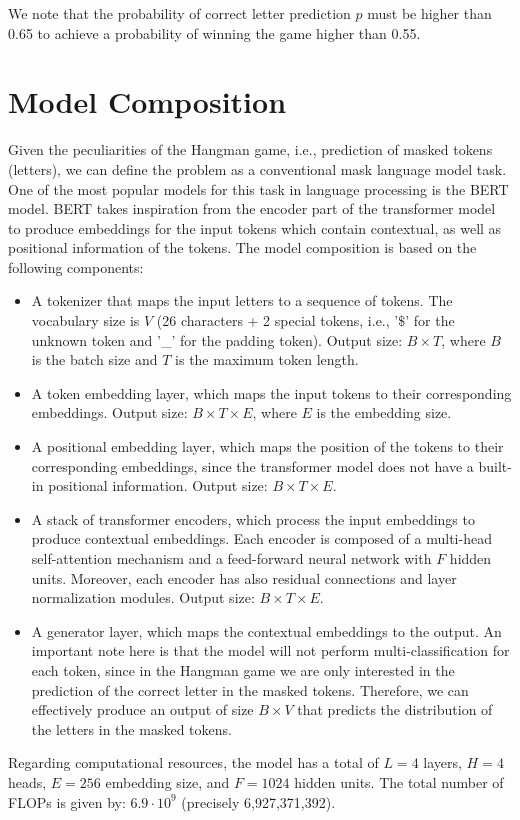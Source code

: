 \documentclass{report}
\begin{document}
We note that the probability of correct letter prediction $p$ must be 
higher than 0.65 to achieve a probability of winning the game higher than 0.55. 


\section*{Model Composition}
Given the peculiarities of the Hangman game, i.e., prediction of masked tokens (letters), we can define the 
problem as a conventional mask language model task. 
One of the most popular models for this task in language processing is the 
\ac{BERT} model. \ac{BERT} takes inspiration from the encoder part of the transformer model to 
produce embeddings for the input tokens which contain contextual, as well as positional information of the tokens.
The model composition is based on the following components:
\begin{itemize}
    \item A tokenizer that maps the input letters to a sequence of tokens. The vocabulary size is $V$ (26 characters + 2 special tokens, i.e., '$\$$' for the unknown token and '\_' for the padding token).
    Output size: $B \times T$, where $B$ is the batch size and $T$ is the maximum token length.
    \item A token embedding layer, which maps the input tokens to their corresponding embeddings. Output size: $B \times T \times E$, where $E$ is the embedding size.
    \item A positional embedding layer, which maps the position of the tokens to their corresponding embeddings, since the transformer model does not have a built-in positional information. Output size: $B \times T \times E$.
    \item A stack of transformer encoders, which process the input embeddings to produce contextual embeddings. 
    Each encoder is composed of a multi-head self-attention mechanism and a feed-forward neural network with $F$ hidden units. Moreover, each encoder has also residual connections and layer normalization modules. Output size: $B \times T \times E$.
    \item A generator layer, which maps the contextual embeddings to the output. An important note here is that the model will not perform multi-classification for each token, 
    since in the Hangman game we are only interested in the prediction of the correct letter in the masked tokens. 
    Therefore, we can effectively produce an output of size $B \times V$ that predicts the distribution of the letters in the masked tokens.
\end{itemize}
Regarding computational resources, the model has a total of $L=4$ layers, $H=4$ heads, $E=256$ embedding size, and $F=1024$ hidden units.
The total number of \ac{FLOPs} is given by: $6.9 \cdot 10^9$ (precisely 6,927,371,392). 
\end{document}
